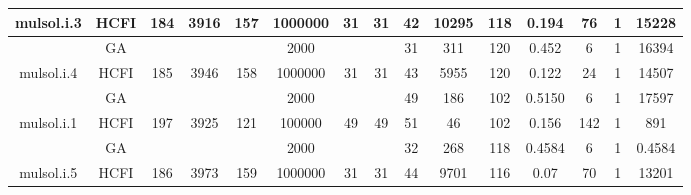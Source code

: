 \documentclass[10pt]{article}
\begin{document}
\begin{center}
\begin{table}[H]
\begin{tabular}{|c|c|c|c|c|c|c|c|c|c|c|c|c|c|c|}
 \multirow{-2}{*}{mulsol.i.3} &HCFI   &\multirow{-2}{*}{184}   &\multirow{-2}{*}{3916}     &\multirow{-2}{*}{157}     &1000000     &\multirow{-2}{*}{\cellcolor{yellow}31}      & \multirow{-2}{*}{\cellcolor{yellow}31}    &{\cellcolor{green}42}     &10295         &118    &0.194         &76    &1     &15228        \\ \hline \hline
	&GA&       &                   &                     &    2000     &     \cellcolor{yellow} & {\cellcolor{yellow}}& {{\cellcolor{green}31}}
&311   &120       &0.452                   & 6                   &1          &16394        \\ \cline{2-2} \cline{6-6} \cline{9-15}
 \multirow{-2}{*}{mulsol.i.4} &HCFI   &\multirow{-2}{*}{185}   &\multirow{-2}{*}{3946}     &\multirow{-2}{*}{158}     &1000000     &\multirow{-2}{*}{\cellcolor{yellow}31}      & \multirow{-2}{*}{\cellcolor{yellow}31}    &{\cellcolor{green}43}     &5955         &120    &0.122         &24    &1     & 14507        \\ \hline \hline
	&GA&       &                   &                     &    2000     &     \cellcolor{yellow} & {\cellcolor{yellow}}& {{\cellcolor{green}49}}
&186   &102        &0.5150                   & 6                   &1          & 17597       \\ \cline{2-2} \cline{6-6} \cline{9-15}
 \multirow{-2}{*}{mulsol.i.1} &HCFI   &\multirow{-2}{*}{197}   &\multirow{-2}{*}{3925}     &\multirow{-2}{*}{121}     &100000     &\multirow{-2}{*}{\cellcolor{yellow}49}      & \multirow{-2}{*}{\cellcolor{yellow}49}    &{\cellcolor{green}51}     &46         &102    &0.156         &142    &1    &891         \\ \hline \hline
	&GA&       &                   &                     &    2000     &     \cellcolor{yellow} & {\cellcolor{yellow}}& {{\cellcolor{green}32}}
&268   &118       &0.4584                   &6                    &1          &0.4584        \\ \cline{2-2} \cline{6-6} \cline{9-15}
 \multirow{-2}{*}{mulsol.i.5} &HCFI   &\multirow{-2}{*}{186}   &\multirow{-2}{*}{3973}     &\multirow{-2}{*}{159}     &1000000     &\multirow{-2}{*}{\cellcolor{yellow}31}      & \multirow{-2}{*}{\cellcolor{yellow}31}    &{\cellcolor{green}44}     &9701         &116    &0.07         &70    & 1    &13201        \\ \hline \hline

\end{tabular}
\end{table}
\end{center}
\end{document}
